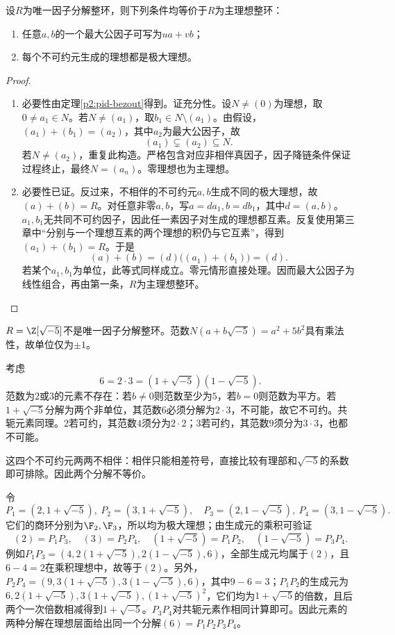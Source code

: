 \begin{theorem}\label{p2:ufd-pid-characterization}
设$R$为唯一因子分解整环，则下列条件均等价于$R$为主理想整环：
\begin{enumerate}
\item 任意$a,b$的一个最大公因子可写为$ua+vb$；
\item 每个不可约元生成的理想都是极大理想。
\end{enumerate}
\end{theorem}
\begin{proof}
\begin{enumerate}
\item 必要性由定理\ref{p2:pid-bezout}得到。证充分性。设$N\ne(0)$为理想，取$0\ne a_1\in N$。若$N\ne(a_1)$，取$b_1\in N\setminus(a_1)$。由假设，$(a_1)+(b_1)=(a_2)$，其中$a_2$为最大公因子，故
\[
(a_1)\subsetneq(a_2)\subseteq N.
\]
若$N\ne(a_2)$，重复此构造。严格包含对应非相伴真因子，因子降链条件保证过程终止，最终$N=(a_n)$。零理想也为主理想。
\item 必要性已证。反过来，不相伴的不可约元$a,b$生成不同的极大理想，故$(a)+(b)=R$。对任意非零$a,b$，写$a=da_1,b=db_1$，其中$d=(a,b)$。$a_1,b_1$无共同不可约因子，因此任一素因子对生成的理想都互素。反复使用第三章中“分别与一个理想互素的两个理想的积仍与它互素”，得到$(a_1)+(b_1)=R$。于是
\[
(a)+(b)=(d)\bigl((a_1)+(b_1)\bigr)=(d).
\]
若某个$a_1,b_1$为单位，此等式同样成立。零元情形直接处理。因而最大公因子为线性组合，再由第一条，$R$为主理想整环。
\end{enumerate}
\end{proof}

\begin{example}
$R=\Z[\sqrt{-5}]$不是唯一因子分解整环。范数$N(a+b\sqrt{-5})=a^2+5b^2$具有乘法性，故单位仅为$\pm1$。

考虑
\[
6=2\cdot3=(1+\sqrt{-5})(1-\sqrt{-5}).
\]
范数为$2$或$3$的元素不存在：若$b\ne0$则范数至少为$5$，若$b=0$则范数为平方。若$1+\sqrt{-5}$分解为两个非单位，其范数$6$必须分解为$2\cdot3$，不可能，故它不可约。共轭元素同理。$2$若可约，其范数$4$须分为$2\cdot2$；$3$若可约，其范数$9$须分为$3\cdot3$，也都不可能。

这四个不可约元两两不相伴：相伴只能相差符号，直接比较有理部和$\sqrt{-5}$的系数即可排除。因此两个分解不等价。
\end{example}

令
\[
P_1=(2,1+\sqrt{-5}),\ P_2=(3,1+\sqrt{-5}),\quad
P_3=(2,1-\sqrt{-5}),\ P_4=(3,1-\sqrt{-5}).
\]
它们的商环分别为$\F_2,\F_3$，所以均为极大理想；由生成元的乘积可验证
\[
(2)=P_1P_3,\quad(3)=P_2P_4,\quad
(1+\sqrt{-5})=P_1P_2,\quad(1-\sqrt{-5})=P_3P_4.
\]
例如$P_1P_3=(4,2(1+\sqrt{-5}),2(1-\sqrt{-5}),6)$，全部生成元均属于$(2)$，且$6-4=2$在乘积理想中，故等于$(2)$。另外，$P_2P_4=(9,3(1+\sqrt{-5}),3(1-\sqrt{-5}),6)$，其中$9-6=3$；$P_1P_2$的生成元为$6,2(1+\sqrt{-5}),3(1+\sqrt{-5}),(1+\sqrt{-5})^2$，它们均为$1+\sqrt{-5}$的倍数，且后两个一次倍数相减得到$1+\sqrt{-5}$。$P_3P_4$对共轭元素作相同计算即可。因此元素的两种分解在理想层面给出同一个分解$(6)=P_1P_2P_3P_4$。

